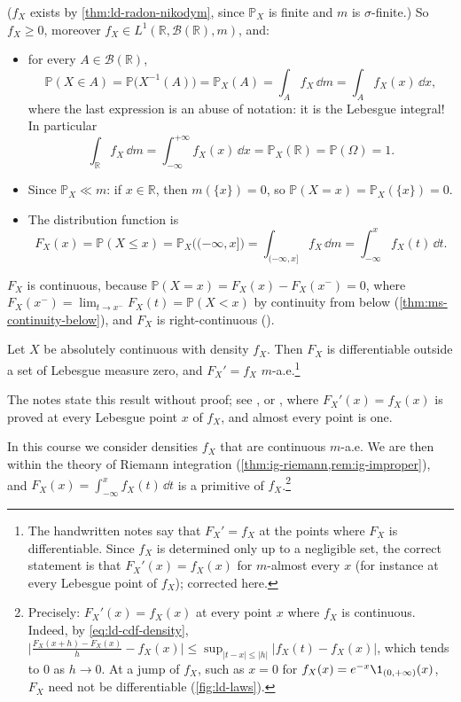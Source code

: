($f_X$ exists by \cref{thm:ld-radon-nikodym}, since $\mathbb P_X$ is finite and $m$ is
$\sigma$-finite.) So $f_X\ge0$, moreover $f_X\in L^1(\mathbb R,\mathcal B(\mathbb R),m)$, and:
\begin{itemize}
  \item for every $A\in\mathcal B(\mathbb R)$,
    \[
      \mathbb P(X\in A)=\mathbb P\big(X^{-1}(A)\big)=\mathbb P_X(A)=\int_Af_X\,\dd m=\int_Af_X(x)\,\dd x,
    \]
    where the last expression is an abuse of notation: it is the Lebesgue integral! In
    particular
    \[
      \int_{\mathbb R}f_X\,\dd m=\int_{-\infty}^{+\infty}f_X(x)\,\dd x=\mathbb P_X(\mathbb R)=\mathbb P(\Omega)=1 .
    \]
  \item Since $\mathbb P_X\ll m$: if $x\in\mathbb R$, then $m(\{x\})=0$, so
    $\mathbb P(X=x)=\mathbb P_X(\{x\})=0$.
  \item The distribution function is
    \begin{equation}\label{eq:ld-cdf-density}
      F_X(x)=\mathbb P(X\le x)=\mathbb P_X\big((-\infty,x]\big)=\int_{(-\infty,x]}f_X\,\dd m=\int_{-\infty}^xf_X(t)\,\dd t .
    \end{equation}
\end{itemize}

$F_X$ is continuous, because $\mathbb P(X=x)=F_X(x)-F_X(x^-)=0$, where
$F_X(x^-)=\lim_{t\to x^-}F_X(t)=\mathbb P(X<x)$ by continuity from below
(\cref{thm:ms-continuity-below}), and $F_X$ is right-continuous ().

\begin{theorem}\label{thm:ld-lebesgue}
Let $X$ be absolutely continuous with density $f_X$. Then $F_X$ is differentiable outside a set
of Lebesgue measure zero, and $F_X'=f_X$ $m$-a.e.\footnote{The handwritten notes say that
$F_X'=f_X$ at the points where $F_X$ is differentiable. Since $f_X$ is determined only up to a
negligible set, the correct statement is that $F_X'(x)=f_X(x)$ for $m$-almost every $x$ (for
instance at every Lebesgue point of $f_X$); corrected here.}
\end{theorem}

The notes state this result without proof; see \citet[Section~31, ``Derivatives of
integrals'']{billingsley}, or \citet[Chapter~7]{rudin-rca}, where $F_X'(x)=f_X(x)$ is proved
at every Lebesgue point $x$ of $f_X$, and almost every point is one.

\begin{remark}\label{rem:ld-continuous-density}
In this course we consider densities $f_X$ that are continuous $m$-a.e. We are then within
the theory of Riemann integration (\cref{thm:ig-riemann,rem:ig-improper}), and
$F_X(x)=\int_{-\infty}^xf_X(t)\,\dd t$ is a primitive of $f_X$.\footnote{Precisely: $F_X'(x)=f_X(x)$
at every point $x$ where $f_X$ is continuous. Indeed, by \eqref{eq:ld-cdf-density},
$\big|\frac{F_X(x+h)-F_X(x)}h-f_X(x)\big|\le\sup_{|t-x|\le|h|}|f_X(t)-f_X(x)|$, which tends to $0$
as $h\to0$. At a jump of $f_X$, such as $x=0$ for $f_X(x)=e^{-x}\1_{(0,+\infty)}(x)$, $F_X$
need not be differentiable (\cref{fig:ld-laws}).}
\end{remark}

